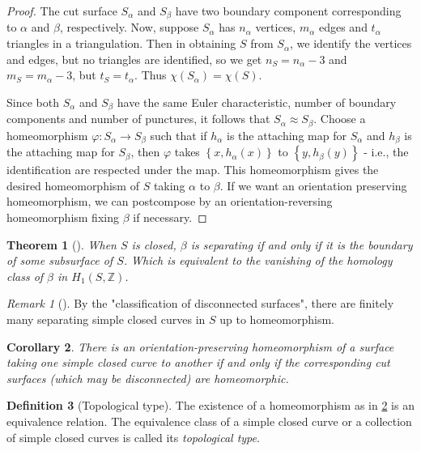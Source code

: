 \documentclass[reqno]{amsart}
\newtheorem{theorem}{Theorem}[section]
\newtheorem{corollary}[theorem]{Corollary}
\theoremstyle{definition}
\newtheorem{definition}[theorem]{Definition}
\theoremstyle{remark}
\newtheorem*{remark}{Remark}
\begin{document}
\begin{proof}
    The cut surface $S_{\alpha}$ and $S_{\beta}$ have
    two boundary component corresponding to $\alpha$ and 
    $\beta$, respectively. 
    Now, suppose $S_{\alpha}$ has
    $n_{\alpha}$ vertices, $m_{\alpha}$ edges and
    $t_{\alpha}$ triangles in a triangulation. Then
    in obtaining $S$ from $S_{\alpha}$, we identify the vertices
    and edges, but no triangles are identified, so we get
    $n_{S} = n_{\alpha}-3$ and $m_{S} = m_{\alpha}-3$, but
    $t_{S} = t_{\alpha}$. Thus $\chi (S_{\alpha}) = 
    \chi (S)$.

    Since both $S_{\alpha}$ and
    $S_{\beta}$ have the same Euler characteristic, number of
    boundary components and number of punctures, it follows
    that $S_{\alpha} \approx S_{\beta}$. Choose
    a homeomorphism $\varphi \colon S_{\alpha} \to S_{\beta}$ such 
    that if $h_{\alpha}$ is the attaching map for $S_{\alpha}$ 
    and $h_{\beta}$ is the attaching map for $S_{\beta}$,
    then $\varphi$ takes $\left\{ x, h_{\alpha}(x) \right\} $ 
    to $\left\{ y, h_{\beta}(y) \right\} $ - i.e., the
    identification are respected under the map.
    This homeomorphism gives the desired
    homeomorphism of $S$ taking $\alpha$ to $\beta$.
    If we want an orientation preserving homeomorphism, we
    can postcompose by an orientation-reversing homeomorphism
    fixing $\beta$ if necessary.
\end{proof}

\begin{theorem}[]
    When $S$ is closed, $\beta$ is separating if and only
    if it is the boundary of some subsurface of $S$. Which
    is equivalent to the vanishing of the
    homology class of $\beta$ in $H_1 \left( S, \mathbb{Z} \right) $.
\end{theorem}

\begin{remark}[]
    By the "classification of disconnected surfaces", there
    are finitely many separating simple closed curves in $S$ 
    up to homeomorphism.
\end{remark}


\begin{corollary}\label{cut-surface-homeo-1}
    There is an orientation-preserving homeomorphism of a surface
    taking one simple closed curve to another if and only
    if the corresponding cut surfaces (which may be disconnected)
    are homeomorphic.
\end{corollary}

\begin{definition}[Topological type]
    The existence of a homeomorphism as in \ref{cut-surface-homeo-1}
    is an equivalence relation. The equivalence class
    of a simple closed curve or a collection of simple closed
    curves is called its \textit{topological type}.
\end{definition}
\end{document}
